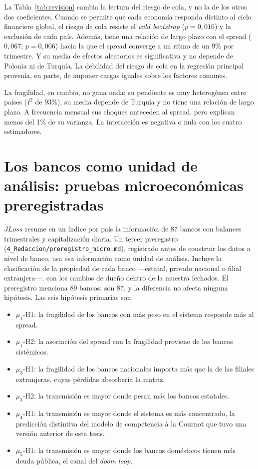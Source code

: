 La Tabla~\ref{tab:revision} cambia la lectura del riesgo de cola, y no la de los otros dos coeficientes. Cuando se permite que cada economía responda distinto al ciclo financiero global, el riesgo de cola resiste el \textit{wild bootstrap} ($p=0{,}016$) y la exclusión de cada país. Además, tiene una relación de largo plazo con el spread ($0{,}067$; $p=0{,}006$) hacia la que el spread converge a un ritmo de un 9\% por trimestre. Y su media de efectos aleatorios es significativa y no depende de Polonia ni de Turquía. La debilidad del riesgo de cola en la regresión principal provenía, en parte, de imponer cargas iguales sobre los factores comunes.

La fragilidad, en cambio, no gana nada: su pendiente es muy heterogénea entre países ($I^2$ de $93\%$), su media depende de Turquía y no tiene una relación de largo plazo. A frecuencia mensual sus choques anteceden al spread, pero explican menos del 1\% de su varianza. La interacción es negativa o nula con los cuatro estimadores.

\section{Los bancos como unidad de análisis: pruebas microeconómicas preregistradas}
\label{sec:micro-prereg}

$JLoss$ resume en un índice por país la información de 87 bancos con balances trimestrales y capitalización diaria. Un tercer preregistro (\texttt{4\_Redaccion/preregistro\_micro.md}), registrado antes de construir los datos a nivel de banco, usa esa información como unidad de análisis. Incluye la clasificación de la propiedad de cada banco ---estatal, privado nacional o filial extranjera---, con los cambios de dueño dentro de la muestra fechados. El preregistro menciona 89 bancos; son 87, y la diferencia no afecta ninguna hipótesis. Las seis hipótesis primarias son:
\begin{itemize}
    \item $\mu_{1}$-H1: la fragilidad de los bancos con más peso en el sistema responde más al spread.
    \item $\mu_{1}$-H2: la asociación del spread con la fragilidad proviene de los bancos sistémicos.
    \item $\mu_{3}$-H1: la fragilidad de los bancos nacionales importa más que la de las filiales extranjeras, cuyas pérdidas absorbería la matriz.
    \item $\mu_{3}$-H2: la transmisión es mayor donde pesan más los bancos estatales.
    \item $\mu_{4}$-H1: la transmisión es mayor donde el sistema es más concentrado, la predicción distintiva del modelo de competencia à la Cournot que tuvo una versión anterior de esta tesis.
    \item $\mu_{5}$-H1: la transmisión es mayor donde los bancos domésticos tienen más deuda pública, el canal del \textit{doom loop}.
\end{itemize}

